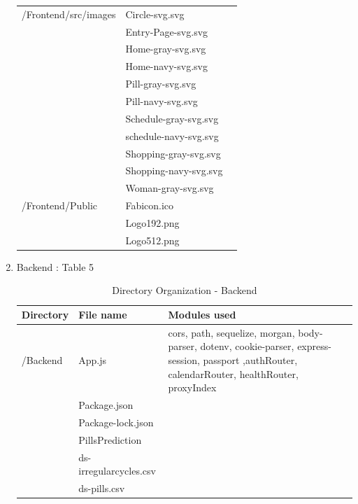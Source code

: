 \documentclass[conference]{IEEEtran}
\begin{document}
\begin{enumerate}
\begin{table}[h!]
\begin{threeparttable}
\begin{tabular}{p{2.4cm}p{2.8cm}p{2cm}}
            \hline
            /Frontend/src/images & Circle-svg.svg \\ 
            & Entry-Page-svg.svg \\
            & Home-gray-svg.svg \\ 
            & Home-navy-svg.svg \\ 
            & Pill-gray-svg.svg \\
            & Pill-navy-svg.svg \\ 
            & Schedule-gray-svg.svg \\ 
            & schedule-navy-svg.svg \\ 
            & Shopping-gray-svg.svg \\ 
            & Shopping-navy-svg.svg \\ 
            & Woman-gray-svg.svg\\
            \hline
            /Frontend/Public & Fabicon.ico \\ 
            & Logo192.png \\ 
            & Logo512.png \\
            \bottomrule
            \end{tabular}
        \end{threeparttable}
    \end{table}
    \item Backend : Table 5
    \begin{table}[ht!] \renewcommand\arraystretch{1.25}
        \begin{threeparttable}
            \caption{Directory Organization - Backend%
            \label{tab:table6}}    %
            \begin{tabular}{p{2cm}p{2.5cm}p{2.7cm}}
            \toprule
            \bfseries Directory & \bfseries File name & \multicolumn{1}{l}{\bfseries Modules used} \\
            \midrule
            /Backend & App.js & cors, path, sequelize, morgan, body-parser, dotenv, cookie-parser, express-session, passport ,authRouter, calendarRouter, healthRouter, proxyIndex  \\
            & Package.json \\
            & Package-lock.json \\
            & PillsPrediction \\
            & ds-irregularcycles.csv \\
            & ds-pills.csv \\
            \hline

\end{tabular}
\end{threeparttable}
\end{table}
\end{enumerate}
\end{document}
